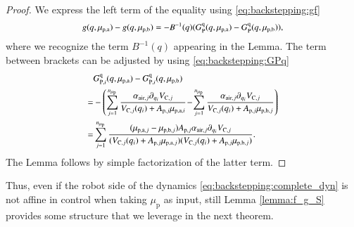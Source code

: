 %
\begin{proof}
	We express the left term of the equality using \eqref{eq:backstepping:gf}
	\begin{equation*}\small%
	\begin{split}
	g(q,\mu_{\mathrm{p},\mathrm{a}}) - g(q,\mu_{\mathrm{p},\mathrm{b}}) 
	=-B^{-1}(q) (G_{\mathrm{P}}^{\mathrm{q}}(q,\mu_{\mathrm{p},\mathrm{a}}) - G_{\mathrm{P}}^{\mathrm{q}}(q,\mu_{\mathrm{p},\mathrm{b}})),
	\end{split}
	\end{equation*}
	where we recognize the term $B^{-1}(q)$ appearing in the Lemma. The term between brackets can be adjusted by using \eqref{eq:backstepping:GPq}
	\begin{equation}\small
	\begin{split}
		&G_{\mathrm{P},i}^{\mathrm{q}}(q,\mu_{\mathrm{p},\mathrm{a}}) - G_{\mathrm{P},i}^{\mathrm{q}}(q,\mu_{\mathrm{p},\mathrm{b}})  \\
	= &-\left(\sum_{j = 1}^{n_{\mu_\mathrm{p}}}  \frac{\alpha_{\mathrm{air},j} \partial_{q_i}V_{\mathrm{C},j}}{V_{\mathrm{C},j}(q_i) + A_{\mathrm{p},j} \mu_{\mathrm{p},\mathrm{a},i}} \!-\! \sum_{j = 1}^{n_{\mu_\mathrm{p}}}  \frac{\alpha_{\mathrm{air},j} \partial_{q_i}V_{\mathrm{C},j}}{V_{\mathrm{C},j}(q_i) + A_{\mathrm{p},j} \mu_{\mathrm{p},\mathrm{b},j}}\right)  \\
	= &\sum_{j = 1}^{n_{\mu_\mathrm{p}}} \frac{ (\mu_{\mathrm{p},\mathrm{a},j} - \mu_{\mathrm{p},\mathrm{b},j})  A_{\mathrm{p},j} \alpha_{\mathrm{air},j} \partial_{q_i}V_{\mathrm{C},j}}{(V_{\mathrm{C},j}(q_i) + A_{\mathrm{p},j} \mu_{\mathrm{p},\mathrm{a},j})(V_{\mathrm{C},j}(q_i) + A_{\mathrm{p},j} \mu_{\mathrm{p},\mathrm{b},j})}.
	\end{split}
	\end{equation}
	The Lemma follows by simple factorization of the latter term.
\end{proof}

Thus, even if the robot side of the dynamics \eqref{eq:backstepping:complete_dyn} is not affine in control when taking $\mu_\mathrm{p}$ as input, still Lemma \ref{lemma:f_g_S} provides some structure that we leverage in the next theorem.

